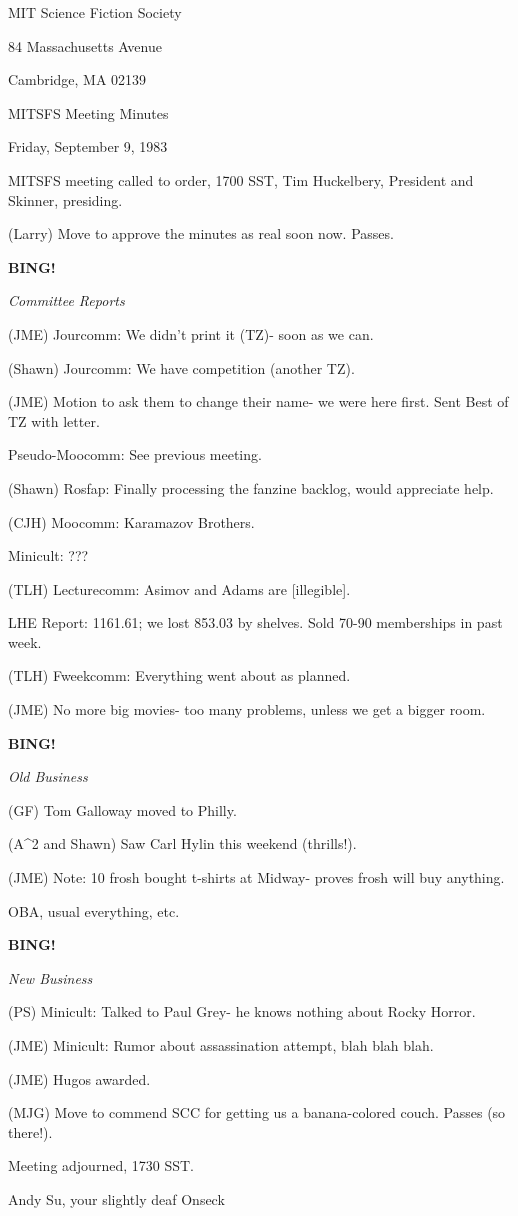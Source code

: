\documentclass[12pt]{article}
\newcommand{\bing}{{\bf BING!} }
\newcommand{\goto}[1]{\bing \vskip 12pt \centerline{{\em{#1}}}}
\begin{document}
\begin{center}

MIT Science Fiction Society 

84 Massachusetts Avenue

Cambridge, MA 02139

\vspace{12pt}

MITSFS Meeting Minutes 

Friday, September 9, 1983

\end{center}
 
\vspace{18pt}

\setlength{\parskip}{6pt}

\noindent
MITSFS meeting called to order, 1700 SST,
Tim Huckelbery, President and Skinner, presiding.

(Larry) Move to approve the minutes as real soon now. Passes.

\goto{Committee Reports}

(JME) Jourcomm: We didn't print it (TZ)- soon as we can.

(Shawn) Jourcomm: We have competition (another TZ).

(JME) Motion to ask them to change their name- we were here first. Sent Best of TZ with letter.

Pseudo-Moocomm: See previous meeting.

(Shawn) Rosfap: Finally processing the fanzine backlog, would appreciate help.

(CJH) Moocomm: Karamazov Brothers.

Minicult: ???

(TLH) Lecturecomm: Asimov and Adams are [illegible].

LHE Report: 1161.61; we lost 853.03 by shelves. Sold 70-90 memberships in past week.

(TLH) Fweekcomm: Everything went about as planned.

(JME) No more big movies- too many problems, unless we get a bigger room.

\goto{Old Business}

(GF) Tom Galloway moved to Philly.

(A^2 and Shawn) Saw Carl Hylin this weekend (thrills!).

(JME) Note: 10 frosh bought t-shirts at Midway- proves frosh will buy anything.

OBA, usual everything, etc.

\goto{New Business}

(PS) Minicult: Talked to Paul Grey- he knows nothing about Rocky Horror.

(JME) Minicult: Rumor about assassination attempt, blah blah blah.

(JME) Hugos awarded.

(MJG) Move to commend SCC for getting us a banana-colored couch. Passes (so there!).

\vspace{12pt}

\noindent
Meeting adjourned, 1730 SST.

\vspace{18pt}

\centerline{Andy Su, your slightly deaf Onseck}
\end{document}
